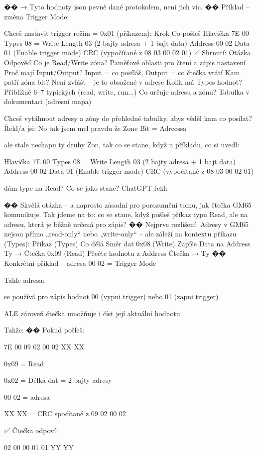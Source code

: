 �� → Tyto hodnoty jsou pevně dané protokolem, není jich víc.
�� Příklad – změna Trigger Mode:

Chceš nastavit trigger režim = 0x01 (příkazem):
Krok	Co pošleš
Hlavička	7E 00
Types	08 = Write
Length	03 (2 bajty adresa + 1 bajt data)
Address	00 02
Data	01 (Enable trigger mode)
CRC	(vypočítané z 08 03 00 02 01)
✅ Shrnutí:
Otázka	Odpověď
Co je Read/Write zóna?	Paměťové oblasti pro čtení a zápis nastavení
Proč mají Input/Output?	Input = co posíláš, Output = co čtečka vrátí
Kam patří zóna bit?	Není zvlášť – je to obsažené v adrese
Kolik má Types hodnot?	Přibližně 6–7 typických (read, write, run...)
Co určuje adresu a zónu?	Tabulka v dokumentaci (adresní mapa)

Chceš vytáhnout adresy a zóny do přehledné tabulky, abys věděl kam co posílat?
Řekl/a jsi:
No tak jsem mel pravdu že Zone Bit = Adreessa

ale stale nechapu ty druhy Zon, tak co se stane, když u příkladu, co si uvedl:

Hlavička	7E 00
Types	08 = Write
Length	03 (2 bajty adresa + 1 bajt data)
Address	00 02
Data	01 (Enable trigger mode)
CRC	(vypočítané z 08 03 00 02 01)

dám type na Read? Co se jako stane?
ChatGPT řekl:

�� Skvělá otázka – a naprosto zásadní pro porozumění tomu, jak čtečka GM65 komunikuje.
Tak jdeme na to: co se stane, když pošleš příkaz typu Read, ale na adresu, která je běžně určená pro zápis?
�� Nejprve rozlišení:
Adresy v GM65 nejsou přímo „read-only“ nebo „write-only“ – ale záleží na kontextu příkazu (Types):
Příkaz (Types)	Co dělá	Směr dat
0x08 (Write)	Zapíše Data na Address	Ty → Čtečka
0x09 (Read)	Přečte hodnotu z Address	Čtečka → Ty
�� Konkrétní příklad – adresa 00 02 = Trigger Mode

Tahle adresa:

    se používá pro zápis hodnot 00 (vypni trigger) nebo 01 (zapni trigger)

    ALE zároveň čtečka umožňuje i číst její aktuální hodnotu

Takže:
�� Pokud pošleš:

7E 00 09 02 00 02 XX XX

    0x09 = Read

    0x02 = Délka dat = 2 bajty adresy

    00 02 = adresa

    XX XX = CRC spočítané z 09 02 00 02

✅ Čtečka odpoví:

02 00 00 01 01 YY YY

